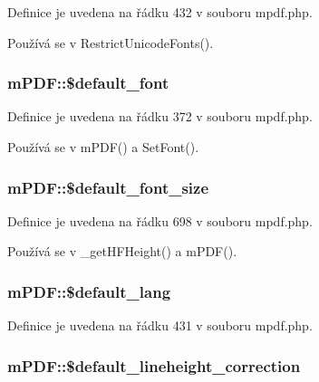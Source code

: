 Definice je uvedena na řádku 432 v souboru mpdf.\-php.



Používá se v Restrict\-Unicode\-Fonts().

\hypertarget{classm_p_d_f_ad235ffb15c4bfc4e902eea8853f54bcd}{
\subsubsection[{\$default\-\_\-font}]{\setlength{\rightskip}{0pt plus 5cm}m\-P\-D\-F\-::\$default\-\_\-font}}\label{classm_p_d_f_ad235ffb15c4bfc4e902eea8853f54bcd}


Definice je uvedena na řádku 372 v souboru mpdf.\-php.



Používá se v m\-P\-D\-F() a Set\-Font().

\hypertarget{classm_p_d_f_ac8085225288a40f9fcc61e07157093a1}{
\subsubsection[{\$default\-\_\-font\-\_\-size}]{\setlength{\rightskip}{0pt plus 5cm}m\-P\-D\-F\-::\$default\-\_\-font\-\_\-size}}\label{classm_p_d_f_ac8085225288a40f9fcc61e07157093a1}


Definice je uvedena na řádku 698 v souboru mpdf.\-php.



Používá se v \-\_\-get\-H\-F\-Height() a m\-P\-D\-F().

\hypertarget{classm_p_d_f_a93e7a96e98535752c4a59f68b351f6dd}{
\subsubsection[{\$default\-\_\-lang}]{\setlength{\rightskip}{0pt plus 5cm}m\-P\-D\-F\-::\$default\-\_\-lang}}\label{classm_p_d_f_a93e7a96e98535752c4a59f68b351f6dd}


Definice je uvedena na řádku 431 v souboru mpdf.\-php.

\hypertarget{classm_p_d_f_a1beb74e1d56f4b8ce2d02aca572d1bf7}{
\subsubsection[{\$default\-\_\-lineheight\-\_\-correction}]{\setlength{\rightskip}{0pt plus 5cm}m\-P\-D\-F\-::\$default\-\_\-lineheight\-\_\-correction}}\label{classm_p_d_f_a1beb74e1d56f4b8ce2d02aca572d1bf7}


